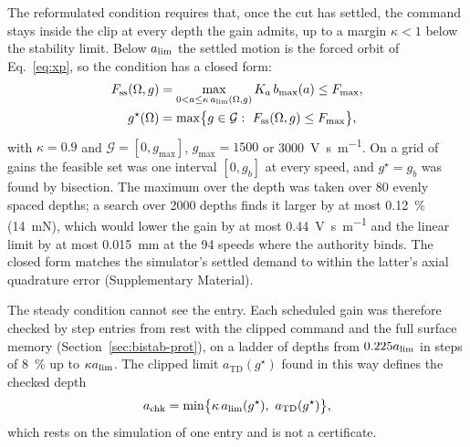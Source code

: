 The reformulated condition requires that, once the cut has settled, the command stays inside the clip at every depth the gain admits, up to a margin $\kappa<1$ below the stability limit. Below $a_{\lim}$ the settled motion is the forced orbit of Eq.~\eqref{eq:xp}, so the condition has a closed form:
\begin{equation}\label{eq:feas}
  \begin{aligned}
    F_{\mathrm{ss}}(\Omega,g)&=\max_{0<a\le\kappa\,\alim(\Omega,g)}K_a\,\bmax(a)\le F_{\max},\\
    g^\star(\Omega)&=\max\bigl\{g\in\mathcal G:\ F_{\mathrm{ss}}(\Omega,g)\le F_{\max}\bigr\},
  \end{aligned}
\end{equation}
with $\kappa=0.9$ and $\mathcal G=[0,g_{\max}]$, $g_{\max}=1500$ or \SI{3000}{\volt\second\per\metre}. On a grid of gains the feasible set was one interval $[0,g_b]$ at every speed, and $g^\star=g_b$ was found by bisection. The maximum over the depth was taken over 80 evenly spaced depths; a search over 2000 depths finds it larger by at most \SI{0.12}{\percent} (\SI{14}{\milli\newton}), which would lower the gain by at most \SI{0.44}{\volt\second\per\metre} and the linear limit by at most \SI{0.015}{\milli\metre} at the 94 speeds where the authority binds. The closed form matches the simulator's settled demand to within the latter's axial quadrature error (Supplementary Material).

The steady condition cannot see the entry. Each scheduled gain was therefore checked by step entries from rest with the clipped command and the full surface memory (Section~\ref{sec:bistab-prot}), on a ladder of depths from $0.225a_{\lim}$ in steps of \SI{8}{\percent} up to $\kappa a_{\lim}$. The clipped limit $a_{\mathrm{TD}}(g^\star)$ found in this way defines the checked depth
\begin{equation}\label{eq:achk}
  \achk=\min\bigl\{\kappa\,\alim(g^\star),\ a_{\mathrm{TD}}(g^\star)\bigr\},
\end{equation}
which rests on the simulation of one entry and is not a certificate.

